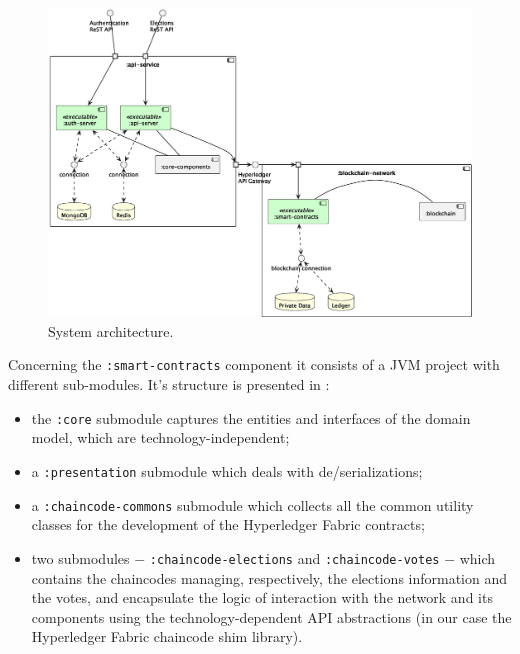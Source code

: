 \documentclass{scrartcl}
\begin{document}
\begin{landscape}
    \begin{figure}
        \centering
        \includegraphics[width=\linewidth]{figures/system-architecture.eps}
        \caption{System architecture.}
        \label{fig:system-architecture}
    \end{figure}
\end{landscape}

Concerning the \texttt{:smart-contracts} component it consists of a JVM project with different sub-modules.
%
It's structure is presented in :
\begin{itemize}
    \item the \texttt{:core} submodule captures the entities and interfaces of the domain model, which are technology-independent;
    \item a \texttt{:presentation} submodule which deals with de/serializations;
    \item a \texttt{:chaincode-commons} submodule which collects all the common utility classes for the development of the Hyperledger Fabric contracts;
    \item two submodules $-$ \texttt{:chaincode-elections} and \texttt{:chaincode-votes} $-$ which contains the chaincodes managing, respectively, the elections information and the votes, and encapsulate the logic of interaction with the network and its components using the technology-dependent API abstractions (in our case the Hyperledger Fabric chaincode shim library).
\end{itemize}
\end{document}

